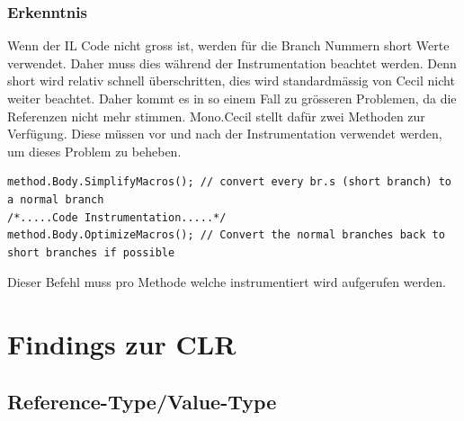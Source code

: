 \documentclass[10pt,a4paper]{article}
\begin{document}
\subsubsection{Erkenntnis}
\begin{flushleft}
Wenn der IL Code nicht gross ist, werden für die Branch Nummern short Werte verwendet.
Daher muss dies während der Instrumentation beachtet werden. Denn short wird relativ schnell überschritten, dies wird standardmässig von Cecil nicht weiter beachtet. Daher kommt es in so einem Fall zu grösseren Problemen, da die Referenzen nicht mehr stimmen.
Mono.Cecil stellt dafür zwei Methoden zur Verfügung. Diese müssen vor und nach der Instrumentation verwendet werden, um dieses Problem zu beheben.
\begin{lstlisting} 
method.Body.SimplifyMacros(); // convert every br.s (short branch) to a normal branch
/*.....Code Instrumentation.....*/
method.Body.OptimizeMacros(); // Convert the normal branches back to short branches if possible
\end{lstlisting}
Dieser Befehl muss pro Methode welche instrumentiert wird aufgerufen werden.
\end{flushleft}
\newpage
\section{Findings zur CLR}
\subsection{Reference-Type/Value-Type}
\end{document}
